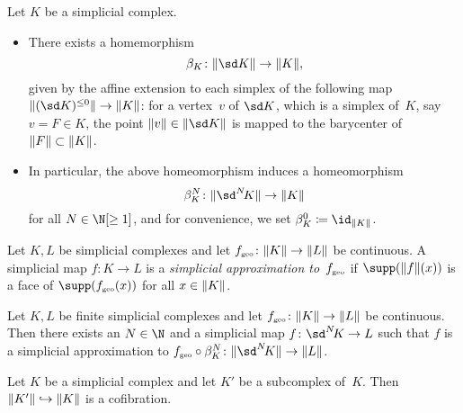 \begin{thProposition}
    Let $K$ be a simplicial complex. 
    \begin{itemize}
        \item
            There exists a homemorphism
            \[ \beta_K\colon \geom{\sd K} \to \geom{K}  , \]
            given by the affine extension to each simplex of the following map
            $\geom{(\sd K)^{\leq 0}}\to\geom{K}$: for a vertex~$v$ of $\sd K$,
            which is a simplex of~$K$, say $v = F\in K$, the point
            $\geom{v}\in\geom{\sd K}$ is mapped to the barycenter of
            $\lVert F\rVert\subset\lVert K\rVert$.
            
        \item
            In particular, the above homeomorphism induces a homeomorphism
            \[ \beta_K^N\colon\geom{\sdNK}\to\geom{K} \]
            for all $N\in\N[\geq1]$, and for convenience, we set
            $\beta_K^0 \defeq \id_{\geom K}$.
    \end{itemize}
\end{thProposition}

\begin{thDef}
    Let $K,L$ be simplicial complexes and let $f_{\scriptscriptstyle\mathrm{geo}}\colon\lVert K\rVert\to\lVert L\rVert$
    be continuous.  A simplicial map $f\colon K\to L$ is a \emph{simplicial
    approximation to~$f_{\scriptscriptstyle\mathrm{geo}}$} if $\supp(\geom{f}(x))$ is a face of
    $\supp(f_\geo(x))$ for all $x\in\lVert K\rVert$.
\end{thDef}

\begin{thTheorem}
    \label{ch1:simpapprox}
    Let $K,L$ be finite simplicial complexes and let
    $f_{\scriptscriptstyle\mathrm{geo}}\colon\lVert K\rVert\to\lVert L\rVert$ be continuous.
    Then there exists an $N\in\N$ and a simplicial map $f\colon\sdNK\to L$
    such that $f$ is a simplicial approximation to
    $f_\geo\after\beta_K^N\colon\geom{\sdNK}\to\geom L$.
\end{thTheorem}

\begin{thLemma}
    \label{ch1:inclcofibration}
    Let $K$ be a simplicial complex and let $K'$ be a subcomplex
    of~$K$. Then $\lVert K'\rVert\hookrightarrow\lVert K\rVert$ is a cofibration.
\end{thLemma}

